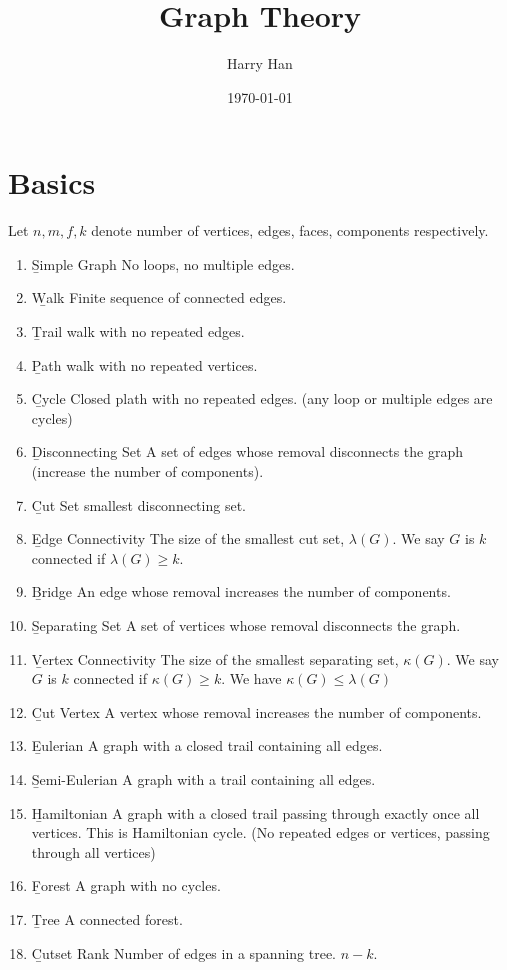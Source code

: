 \documentclass[12pt]{article}
\title{Graph Theory}
\author{Harry Han}
\date{\today}
\begin{document}
\section{Basics}

\begin{definition}[Graph]
	Let $n, m, f, k$ denote number of vertices, edges, faces, components respectively. 
	\begin{enumerate}
		\item	\b{Simple Graph} No loops, no multiple edges.	
		\item	\b{Walk} Finite sequence of connected edges.
		\item	\b{Trail} walk with no repeated edges.
		\item	\b{Path} walk with no repeated vertices.
		\item 	\b{Cycle} Closed plath with no repeated edges. (any loop or multiple edges are cycles)
		\item	\b{Disconnecting Set} A set of edges whose removal disconnects the graph (increase the number of components).
		\item	\b{Cut Set} smallest disconnecting set.
		\item	\b{Edge Connectivity} The size of the smallest cut set, $\lambda (G)$. We say $G$ is $k$ connected if $\lambda (G) \geq k$.
		\item	\b{Bridge} An edge whose removal increases the number of components.
		\item	\b{Separating Set} A set of vertices whose removal disconnects the graph.
		\item	\b{Vertex Connectivity} The size of the smallest separating set, $\kappa (G)$. We say $G$ is $k$ connected if $\kappa (G) \geq k$. We have $\kappa (G) \leq \lambda (G)$
		\item	\b{Cut Vertex} A vertex whose removal increases the number of components.
		\item	\b{Eulerian} A graph with a closed trail containing all edges.
		\item	\b{Semi-Eulerian} A graph with a trail containing all edges.
		\item	\b{Hamiltonian} A graph with a closed trail passing through exactly once all vertices. This is Hamiltonian cycle. (No repeated edges or vertices, passing through all vertices)
		\item	\b{Forest} A graph with no cycles.
		\item	\b{Tree} A connected forest.
		\item	\b{Cutset Rank} Number of edges in a spanning tree. $n-k$.

\end{enumerate}
\end{definition}
\end{document}
